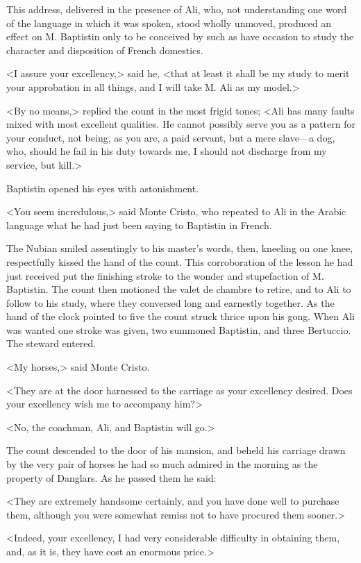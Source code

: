  This address, delivered in the presence of Ali, who, not understanding one word of the language in which it was spoken, stood wholly unmoved, produced an effect on M. Baptistin only to be conceived by such as have occasion to study the character and disposition of French domestics. 

 <I assure your excellency,> said he, <that at least it shall be my study to merit your approbation in all things, and I will take M. Ali as my model.> 

 <By no means,> replied the count in the most frigid tones; <Ali has many faults mixed with most excellent qualities. He cannot possibly serve you as a pattern for your conduct, not being, as you are, a paid servant, but a mere slave—a dog, who, should he fail in his duty towards me, I should not discharge from my service, but kill.> 

 Baptistin opened his eyes with astonishment. 

 <You seem incredulous,> said Monte Cristo, who repeated to Ali in the Arabic language what he had just been saying to Baptistin in French. 

 The Nubian smiled assentingly to his master's words, then, kneeling on one knee, respectfully kissed the hand of the count. This corroboration of the lesson he had just received put the finishing stroke to the wonder and stupefaction of M. Baptistin. The count then motioned the valet de chambre to retire, and to Ali to follow to his study, where they conversed long and earnestly together. As the hand of the clock pointed to five the count struck thrice upon his gong. When Ali was wanted one stroke was given, two summoned Baptistin, and three Bertuccio. The steward entered. 

 <My horses,> said Monte Cristo. 

 <They are at the door harnessed to the carriage as your excellency desired. Does your excellency wish me to accompany him?> 

 <No, the coachman, Ali, and Baptistin will go.> 

 The count descended to the door of his mansion, and beheld his carriage drawn by the very pair of horses he had so much admired in the morning as the property of Danglars. As he passed them he said: 

 <They are extremely handsome certainly, and you have done well to purchase them, although you were somewhat remiss not to have procured them sooner.> 

 <Indeed, your excellency, I had very considerable difficulty in obtaining them, and, as it is, they have cost an enormous price.> 

